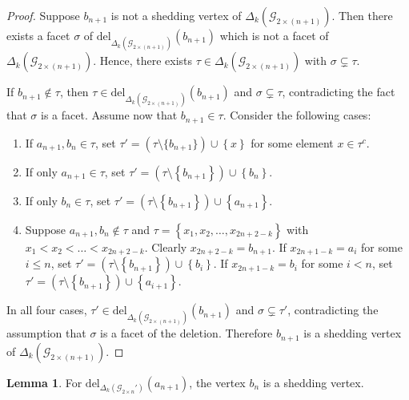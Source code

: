 \documentclass[11pt,reqno,a4paper]{amsart}
\theoremstyle{definition}
\theoremstyle{theorem}
\newtheorem{lemma}[theorem]{Lemma}
\newcommand{\kcut}{\Delta_{k}}
\newcommand{\twoggn}{\mathcal{G}_{2\times \left(n+1\right)}}
\newcommand{\twoggp}{\mathcal{G}_{2\times n}'}
\newcommand{\lno}{\left(}
\newcommand{\rno}{\right)}
\newcommand{\lcu}{\left\{}
\newcommand{\rcu}{\right\}}
\newcommand{\del}{\mathrm{del}}
\theoremstyle{remark}
\begin{document}
\begin{proof}
    Suppose $b_{n+1}$ is not a shedding vertex of $\kcut \lno \twoggn \rno$. Then there exists a facet $\sigma$ of $\del_{\kcut \lno \twoggn \rno}\lno b_{n+1} \rno$ which is not a facet of $\kcut \lno \twoggn \rno$. Hence, there exists $\tau \in \kcut \lno \twoggn \rno$ with $\sigma \subsetneq \tau.$

    If $b_{n+1} \notin \tau$, then $\tau \in \del_{\kcut \lno \twoggn \rno}\lno b_{n+1} \rno$ and $\sigma \subsetneq \tau$, contradicting the fact that $\sigma$ is a facet. Assume now that $b_{n+1} \in \tau$. Consider the following cases:

    \begin{enumerate}[label=\arabic*.]
        \item If $a_{n+1}, b_n \in \tau$, set $\tau' = \lno \tau \setminus \{b_{n+1}\} \rno \cup \lcu x \rcu$ for some element $x \in \tau^c$.

        \item If only $a_{n+1} \in \tau$, set $\tau' = \lno \tau \setminus \lcu b_{n+1} \rcu \rno \cup \lcu b_n \rcu.$

        \item If only $b_n \in \tau$, set $\tau' = \lno \tau \setminus \lcu b_{n+1} \rcu \rno \cup \lcu a_{n+1} \rcu.$

        \item Suppose $a_{n+1}, b_n \notin \tau$ and $\tau = \lcu x_1, x_2, \dots, x_{2n+2-k} \rcu$ with $x_1 < x_2 < \dots < x_{2n+2-k}$. Clearly $x_{2n+2-k} = b_{n+1}$.  
        If $x_{2n+1-k} = a_i$ for some $i \leq n$, set $\tau' = \lno \tau \setminus \lcu b_{n+1} \rcu \rno \cup \lcu b_i \rcu.$
        If $x_{2n+1-k} = b_i$ for some $i < n$, set $\tau' = \lno \tau \setminus \lcu b_{n+1} \rcu \rno \cup \lcu a_{i+1} \rcu.$
    \end{enumerate}

    In all four cases, $\tau' \in \del_{\kcut \lno \twoggn \rno}\lno b_{n+1} \rno$ and $\sigma \subsetneq \tau'$, contradicting the assumption that $\sigma$ is a facet of the deletion. Therefore $b_{n+1}$ is a shedding vertex of $\kcut \lno \twoggn \rno$.
\end{proof}

	\begin{lemma}\label{lemma: b_n is shedding vertex}
		For $\del_{\kcut\lno \twoggp \rno}\lno a_{n+1} \rno$, the vertex $b_n$ is a shedding vertex.
	\end{lemma}
	
\end{document}
